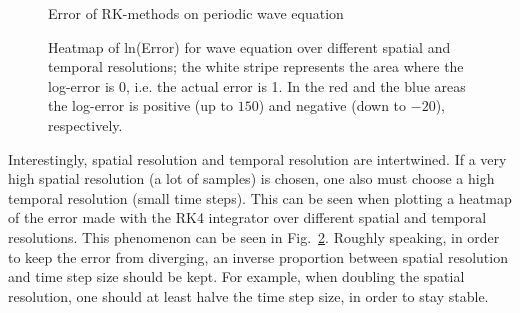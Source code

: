 \begin{figure}[!h]
    \caption{Error of RK-methods on periodic wave equation}
    \label{fig:wave_order_line}
\end{figure}
\begin{figure}[!h]
    \caption{Heatmap of ln(Error) for wave equation over different spatial and temporal resolutions;
    the white stripe represents the area where the log-error is 0, i.e. the actual error is 1.
In the red and the blue areas the log-error is positive (up to $150$) and negative (down to $-20$), respectively.}
    \label{fig:heatmap_wave_eq_step_size_numgridpoints}

\end{figure}


Interestingly, spatial resolution and temporal resolution are intertwined.
If a very high spatial resolution (a lot of samples) is chosen, one also must choose a high temporal resolution (small time steps).
This can be seen when plotting a heatmap of the error made with the RK4 integrator over different spatial and temporal resolutions.
This phenomenon can be seen in Fig.~\ref{fig:heatmap_wave_eq_step_size_numgridpoints}.
Roughly speaking, in order to keep the error from diverging, an inverse proportion between spatial resolution and time step size should be kept.
For example, when doubling the spatial resolution, one should at least halve the time step size, in order to stay stable.


